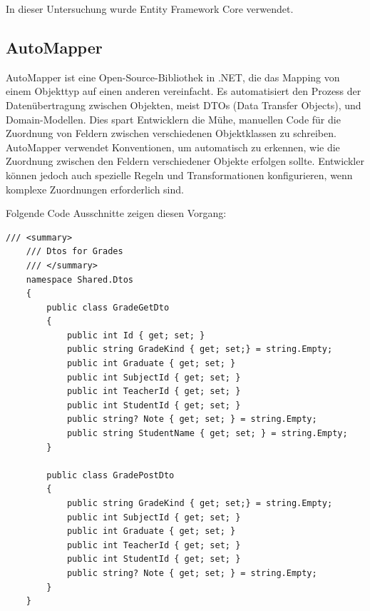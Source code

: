 In dieser Untersuchung wurde Entity Framework Core verwendet.
    \newpage
\subsection{AutoMapper}
AutoMapper ist eine Open-Source-Bibliothek in .NET, die das Mapping von einem Objekttyp auf einen anderen vereinfacht. Es automatisiert den Prozess der Datenübertragung zwischen Objekten, meist DTOs (Data Transfer Objects), und Domain-Modellen. Dies spart Entwicklern die Mühe, manuellen Code für die Zuordnung von Feldern zwischen verschiedenen Objektklassen zu schreiben.
AutoMapper verwendet Konventionen, um automatisch zu erkennen, wie die Zuordnung zwischen den Feldern verschiedener Objekte erfolgen sollte. Entwickler können jedoch auch spezielle Regeln und Transformationen konfigurieren, wenn komplexe Zuordnungen erforderlich sind.


Folgende Code Ausschnitte zeigen diesen Vorgang:

\begin{lstlisting}[language={[Sharp]C}, caption=DTO, label=lst:imp:dto]
    /// <summary>
    /// Dtos for Grades
    /// </summary>
    namespace Shared.Dtos
    {
        public class GradeGetDto
        {
            public int Id { get; set; } 
            public string GradeKind { get; set;} = string.Empty;
            public int Graduate { get; set; }
            public int SubjectId { get; set; }
            public int TeacherId { get; set; } 
            public int StudentId { get; set; } 
            public string? Note { get; set; } = string.Empty;
            public string StudentName { get; set; } = string.Empty;
        }

        public class GradePostDto
        {
            public string GradeKind { get; set;} = string.Empty;
            public int SubjectId { get; set; }
            public int Graduate { get; set; }
            public int TeacherId { get; set; } 
            public int StudentId { get; set; } 
            public string? Note { get; set; } = string.Empty;
        }
    }
\end{lstlisting}

